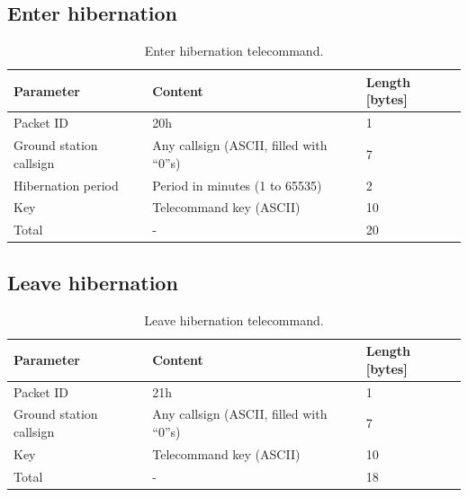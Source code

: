 \subsection{Enter hibernation}

\begin{table}[!h]
    \centering
    \begin{tabular}{lll}
        \toprule[1.5pt]
        \textbf{Parameter}      & \textbf{Content}                         & \textbf{Length [bytes]} \\
        \midrule
        Packet ID               & 20h                                      & 1 \\
        Ground station callsign & Any callsign (ASCII, filled with ``0''s) & 7 \\
        Hibernation period      & Period in minutes (1 to 65535)           & 2 \\
        Key                     & Telecommand key (ASCII)                  & 10 \\
        \midrule
        Total                   & -                                        & 20 \\
        \bottomrule[1.5pt]
    \end{tabular}
    \caption{Enter hibernation telecommand.}
    \label{tab:enter-hibernation-tc}
\end{table}

\subsection{Leave hibernation}

\begin{table}[!h]
    \centering
    \begin{tabular}{lll}
        \toprule[1.5pt]
        \textbf{Parameter}      & \textbf{Content}                         & \textbf{Length [bytes]} \\
        \midrule
        Packet ID               & 21h                                      & 1 \\
        Ground station callsign & Any callsign (ASCII, filled with ``0''s) & 7 \\
        Key                     & Telecommand key (ASCII)                  & 10 \\
        \midrule
        Total                   & -                                        & 18 \\
        \bottomrule[1.5pt]
    \end{tabular}
    \caption{Leave hibernation telecommand.}
    \label{tab:leave-hibernation-tc}
\end{table}

